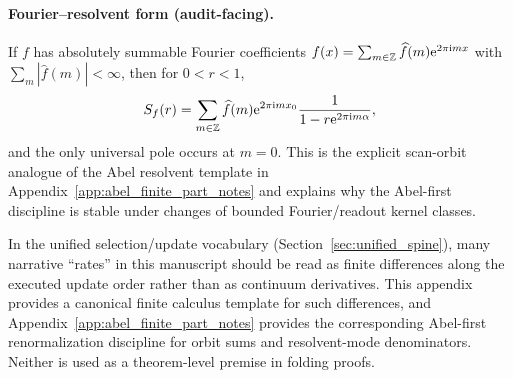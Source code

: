 \paragraph{Fourier--resolvent form (audit-facing).}
\MathTag If $f$ has absolutely summable Fourier coefficients $f(x)=\sum_{m\in\mathbb{Z}}\widehat f(m)\mathrm{e}^{2\pi\mathrm{i} m x}$ with $\sum_m|\widehat f(m)|<\infty$, then for $0<r<1$,
\[
S_f(r)=\sum_{m\in\mathbb{Z}}\widehat f(m)\mathrm{e}^{2\pi\mathrm{i} m x_0}\frac{1}{1-r\mathrm{e}^{2\pi\mathrm{i} m\alpha}},
\]
and the only universal pole occurs at $m=0$.
This is the explicit scan-orbit analogue of the Abel resolvent template in Appendix~\ref{app:abel_finite_part_notes} and explains why the Abel-first discipline is stable under changes of bounded Fourier/readout kernel classes.

\begin{remark}\label{rem:cyclic_calculus_usage_in_z128}
\AuditTag In the unified selection/update vocabulary (Section~\ref{sec:unified_spine}), many narrative ``rates'' in this manuscript should be read as finite differences along the executed update order rather than as continuum derivatives.
This appendix provides a canonical finite calculus template for such differences, and Appendix~\ref{app:abel_finite_part_notes} provides the corresponding Abel-first renormalization discipline for orbit sums and resolvent-mode denominators.
Neither is used as a theorem-level premise in folding proofs.
\end{remark}

